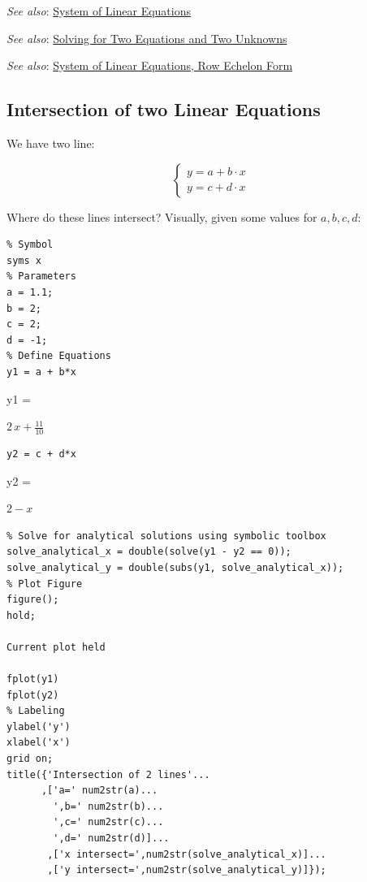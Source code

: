 \documentclass[
]{book}
\begin{document}
\emph{See also}: \href{https://math4econ.github.io/matrix_system_of_equations/matrix_linear_equations.html}{System of Linear
Equations}

\emph{See also}: \href{https://math4econ.github.io/matrix_system_of_equations/matrix_linear_system_2.html}{Solving for Two Equations and Two
Unknowns}

\emph{See also}: \href{https://math4econ.github.io/matrix_system_of_equations/matrix_row_echelon_form.html}{System of Linear Equations, Row Echelon
Form}

\hypertarget{intersection-of-two-linear-equations}{%
\subsection{Intersection of two Linear Equations}\label{intersection-of-two-linear-equations}}

We have two line:

\[\left\lbrace \begin{array}{c}
y=a+b\cdot x\\
y=c+d\cdot x
\end{array}\right.\]

Where do these lines intersect? Visually, given some values for
\(a,b,c,d\):

\begin{verbatim}
% Symbol
syms x 
% Parameters
a = 1.1;
b = 2;
c = 2;
d = -1;
% Define Equations
y1 = a + b*x
\end{verbatim}

y1 =

\(\displaystyle 2\,x+\frac{11}{10}\)

\begin{verbatim}
y2 = c + d*x
\end{verbatim}

y2 =

\(\displaystyle 2-x\)

\begin{verbatim}
% Solve for analytical solutions using symbolic toolbox
solve_analytical_x = double(solve(y1 - y2 == 0));
solve_analytical_y = double(subs(y1, solve_analytical_x));
% Plot Figure
figure();
hold;

Current plot held

fplot(y1)
fplot(y2)
% Labeling
ylabel('y')
xlabel('x')
grid on;
title({'Intersection of 2 lines'...
      ,['a=' num2str(a)...
        ',b=' num2str(b)...
        ',c=' num2str(c)...
        ',d=' num2str(d)]...
       ,['x intersect=',num2str(solve_analytical_x)]...
       ,['y intersect=',num2str(solve_analytical_y)]});
\end{verbatim}
\end{document}
